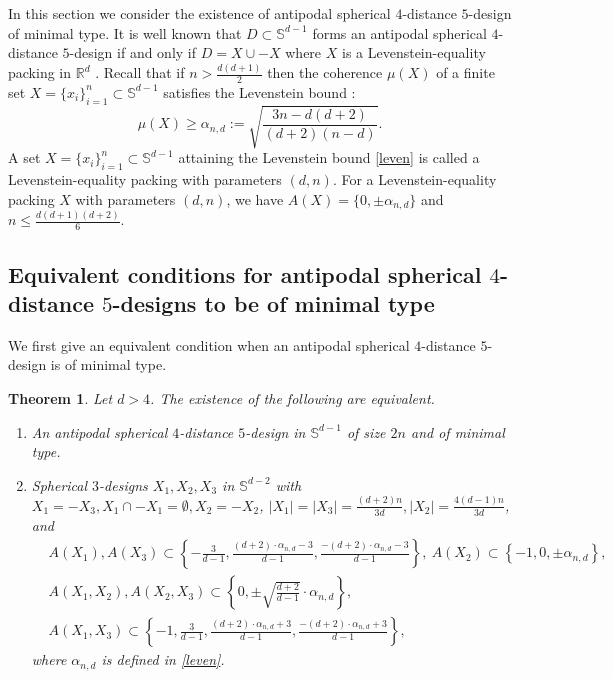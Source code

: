 \documentclass[11pt]{article}
\newtheorem{theorem}{Theorem}[section]
\theoremstyle{definition}
\theoremstyle{remark}
\begin{document}
In this section we consider the existence of antipodal spherical $4$-distance $5$-design of minimal type. It is well known that $D\subset \mathbb{S}^{d-1}$ forms an antipodal spherical $4$-distance $5$-design if and only if $D=X\cup -X$ where $X$ is a Levenstein-equality packing in $\mathbb{R}^d$ \cite[Example 8.4]{DGS77}. 
Recall that if $n>\frac{d(d+1)}{2}$ then the coherence $\mu(X)$ of a finite set $X=\{x_i\}_{i=1}^{n}\subset \mathbb{S}^{d-1}$ satisfies the Levenstein bound \cite{leven,leven2}:
\begin{equation}\label{leven}
\mu(X)\geq\alpha_{n,d}:= \sqrt{\frac{3n-d(d+2)}{(d+2)(n-d)}}.
\end{equation}
A set $X=\{x_i\}_{i=1}^{n}\subset \mathbb{S}^{d-1}$ attaining the Levenstein bound \eqref{leven} is called a Levenstein-equality packing with parameters $(d,n)$. 
For a Levenstein-equality packing $X$ with parameters $(d,n)$, we have $A(X)=\{0,\pm\alpha_{n,d}\}$ and $n\leq \frac{d(d+1)(d+2)}{6}$. 

\subsection{Equivalent conditions for antipodal spherical $4$-distance $5$-designs to be of minimal type}


We first give an equivalent condition when an antipodal spherical $4$-distance $5$-design is of minimal type. 


\begin{theorem}\label{thm:levenstein}
Let $d>4$. 
The existence of the following are equivalent.
\begin{enumerate}
\item[{\rm (i)}] An antipodal spherical $4$-distance $5$-design in $\mathbb{S}^{d-1}$
of size $2n$ and of minimal type.
\item[{\rm (ii)}] Spherical $3$-designs $X_1,X_2,X_3$ in $\mathbb{S}^{d-2}$ with $X_1=-X_3,X_1\cap -X_1=\emptyset, X_2=-X_2$, $|X_1|=|X_3|=\frac{(d+2)n}{3d}, |X_2|=\frac{4(d-1)n}{3d}$, and 
\begin{align*}
&A(X_1),A(X_3)\subset\left\{-\frac{3}{d-1},\frac{(d+2)\cdot \alpha_{n,d}-3}{d-1},\frac{-(d+2)\cdot \alpha_{n,d}-3}{d-1} \right\},\ A(X_2)\subset \left\{-1,0,\pm\alpha_{n,d}\right\},\\
&A(X_1,X_2),A(X_2,X_3)\subset\left\{0,\pm \sqrt{\frac{d+2}{d-1}}\cdot \alpha_{n,d}\right\},\\
& A(X_1,X_3)\subset\left\{-1,\frac{3}{d-1},\frac{(d+2)\cdot \alpha_{n,d}+3}{d-1},\frac{-(d+2)\cdot \alpha_{n,d}+3}{d-1}\right\},
\end{align*}
where $\alpha_{n,d}$ is defined in \eqref{leven}.

\end{enumerate}

\end{theorem}
\end{document}
